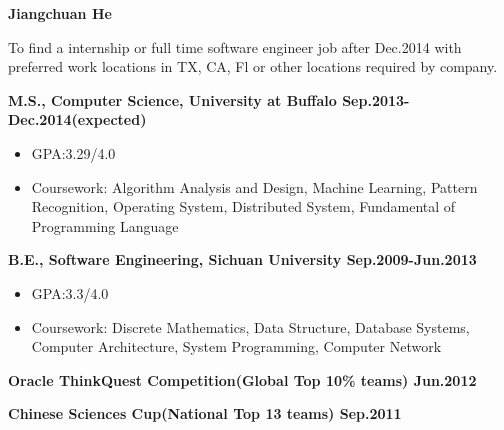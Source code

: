 \documentclass{myres}
\begin{document}
{\LARGE \bf Jiangchuan He}
\myline

{

}

{
	To find a internship or full time software engineer job after Dec.2014 with preferred work locations in
	TX, CA, Fl or other locations required by company.
}
{\textbf{M.S., Computer Science, University at Buffalo \hfill Sep.2013-Dec.2014(expected)} 		
\begin{itemize}[topsep=0pt, leftmargin=0.2in] \itemsep -5pt
	\item[]GPA:3.29/4.0
	\item[]Coursework: Algorithm Analysis and Design, Machine Learning, Pattern Recognition, Operating System, Distributed System,
		Fundamental of Programming Language
\end{itemize}
\par
\smallskip
\textbf{B.E., Software Engineering, Sichuan University \hfill Sep.2009-Jun.2013} 		
\begin{itemize}[topsep=0pt, leftmargin=0.2in] \itemsep -5pt
	\item[]GPA:3.3/4.0
	\item[]Coursework: Discrete Mathematics, Data Structure, Database Systems, Computer Architecture, System Programming,
		Computer Network
\end{itemize}

}
{
	\textbf{Oracle ThinkQuest Competition(Global Top 10\% teams) \hfill  Jun.2012}
	\par
 	\textbf{Chinese Sciences Cup(National Top 13 teams) \hfill Sep.2011}
}
\end{document}
